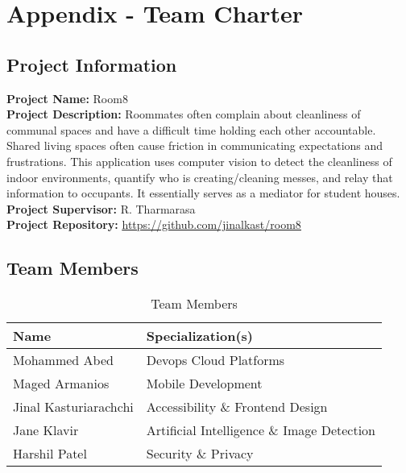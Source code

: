 \documentclass[12pt, titlepage]{article}
\begin{document}
\section*{Appendix - Team Charter}

\subsection*{Project Information}

\textbf{Project Name:} Room8 \\
\textbf{Project Description:} Roommates often complain about cleanliness of communal spaces and have a difficult time holding each other accountable. Shared living spaces often cause friction in communicating expectations and frustrations. This application uses computer vision to detect the cleanliness of indoor environments, quantify who is creating/cleaning messes, and relay that information to occupants. It essentially serves as a mediator for student houses. \\
\textbf{Project Supervisor:} R. Tharmarasa \\
\textbf{Project Repository:} \href{https://github.com/jinalkast/room8}{\underline{https://github.com/jinalkast/room8}} 

\subsection*{Team Members}
\begin{table}[H]
\caption{Team Members}
\begin{tabular}{|l|l|}
\hline
\textbf{Name} & \textbf{Specialization(s)} \\ \hline
Mohammed Abed & Devops Cloud Platforms \\ \hline
Maged Armanios & Mobile Development \\ \hline
Jinal Kasturiarachchi & Accessibility \& Frontend Design \\ \hline
Jane Klavir & Artificial Intelligence \& Image Detection \\ \hline
Harshil Patel & Security \& Privacy \\ \hline
\end{tabular}
\label{tab:charter-team-members}
\end{table}
\end{document}
